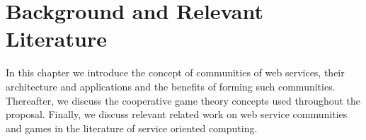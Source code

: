 \setcounter{chapter}{1}

\chapter{Background and Relevant Literature}\label{sec:MAS}

In this chapter we introduce
the concept of communities of web services, their architecture and
applications and the benefits of forming such communities. Thereafter,
we discuss the cooperative game theory concepts used throughout
the proposal. Finally, we discuss relevant related work on web
service communities and games in the literature of service
oriented computing.

%
%
%
